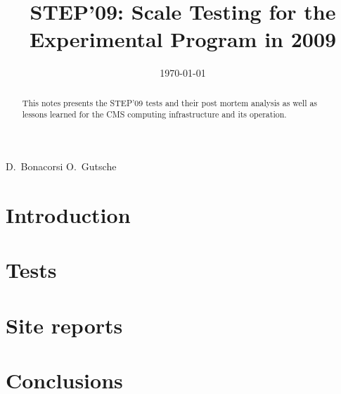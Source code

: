 \documentclass{cmspaper}
\begin{document}
\begin{titlepage}


  \date{\today}

  \title{STEP'09: Scale Testing for the Experimental Program in 2009}

  \begin{Authlist}
    D.~Bonacorsi
     O.~Gutsche
  \end{Authlist}


  \begin{abstract}
    This notes presents the STEP'09 tests and their post mortem
    analysis as well as lessons learned for the CMS computing
    infrastructure and its operation.
  \end{abstract} 


\end{titlepage}

\setcounter{tocdepth}{2}
\tableofcontents

\newpage

\section{Introduction}
\label{sec:intro}

\newpage

\section{Tests}
\label{sec:tests}









\newpage

\section{Site reports}
\label{sec:sites}















\newpage

\section{Conclusions}
\label{sec:con}


\end{document}
